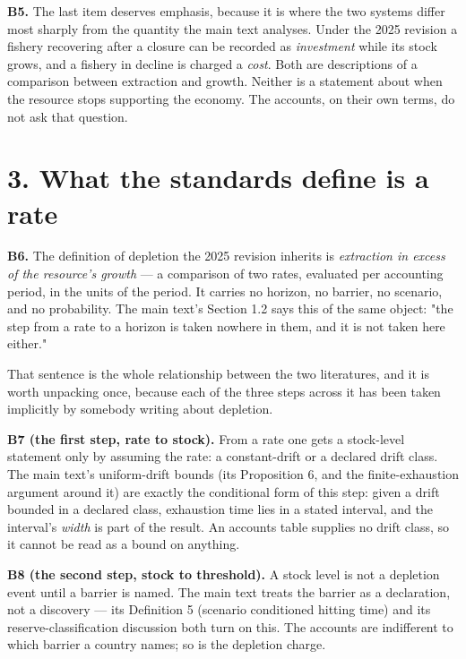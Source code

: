 \documentclass[11pt]{article}
\begin{document}
\textbf{B5.} The last item deserves emphasis, because it is where the two systems differ most sharply from the quantity the main text analyses. Under the 2025 revision a fishery recovering after a closure can be recorded as \emph{investment} while its stock grows, and a fishery in decline is charged a \emph{cost}. Both are descriptions of a comparison between extraction and growth. Neither is a statement about when the resource stops supporting the economy. The accounts, on their own terms, do not ask that question.

\vspace{0.8em}

\section*{3. What the standards define is a rate}\label{3-what-the-standards-define-is-a-rate}

\textbf{B6.} The definition of depletion the 2025 revision inherits is \emph{extraction in excess of the resource's growth} --- a comparison of two rates, evaluated per accounting period, in the units of the period. It carries no horizon, no barrier, no scenario, and no probability. The main text's Section 1.2 says this of the same object: "the step from a rate to a horizon is taken nowhere in them, and it is not taken here either."

That sentence is the whole relationship between the two literatures, and it is worth unpacking once, because each of the three steps across it has been taken implicitly by somebody writing about depletion.

\textbf{B7 (the first step, rate to stock).} From a rate one gets a stock-level statement only by assuming the rate: a constant-drift or a declared drift class. The main text's uniform-drift bounds (its Proposition 6, and the finite-exhaustion argument around it) are exactly the conditional form of this step: given a drift bounded in a declared class, exhaustion time lies in a stated interval, and the interval's \emph{width} is part of the result. An accounts table supplies no drift class, so it cannot be read as a bound on anything.

\textbf{B8 (the second step, stock to threshold).} A stock level is not a depletion event until a barrier is named. The main text treats the barrier as a declaration, not a discovery --- its Definition 5 (scenario conditioned hitting time) and its reserve-classification discussion both turn on this. The accounts are indifferent to which barrier a country names; so is the depletion charge.
\end{document}
